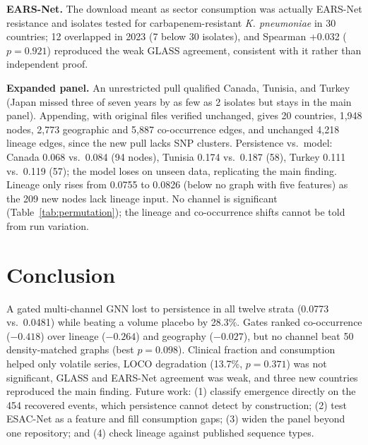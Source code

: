 \documentclass[journal]{IEEEtran}
\begin{document}
\textbf{EARS-Net.} The download meant as sector consumption was actually EARS-Net resistance and isolates tested for carbapenem-resistant \textit{K. pneumoniae} in 30 countries; 12 overlapped in 2023 (7 below 30 isolates), and Spearman +0.032 ($p=0.921$) reproduced the weak GLASS agreement, consistent with it rather than independent proof.

\textbf{Expanded panel.} An unrestricted pull qualified Canada, Tunisia, and Turkey (Japan missed three of seven years by as few as 2 isolates but stays in the main panel). Appending, with original files verified unchanged, gives 20 countries, 1,948 nodes, 2,773 geographic and 5,887 co-occurrence edges, and unchanged 4,218 lineage edges, since the new pull lacks SNP clusters. Persistence vs.\ model: Canada 0.068 vs.\ 0.084 (94 nodes), Tunisia 0.174 vs.\ 0.187 (58), Turkey 0.111 vs.\ 0.119 (57); the model loses on unseen data, replicating the main finding. Lineage only rises from 0.0755 to 0.0826 (below no graph with five features) as the 209 new nodes lack lineage input. No channel is significant (Table~\ref{tab:permutation}); the lineage and co-occurrence shifts cannot be told from run variation.

\section{Conclusion}\label{sec:concl}
A gated multi-channel GNN lost to persistence in all twelve strata (0.0773 vs.\ 0.0481) while beating a volume placebo by 28.3\%. Gates ranked co-occurrence ($-0.418$) over lineage ($-0.264$) and geography ($-0.027$), but no channel beat 50 density-matched graphs (best $p=0.098$). Clinical fraction and consumption helped only volatile series, LOCO degradation (13.7\%, $p=0.371$) was not significant, GLASS and EARS-Net agreement was weak, and three new countries reproduced the main finding. Future work: (1) classify emergence directly on the 454 recovered events, which persistence cannot detect by construction; (2) test ESAC-Net as a feature and fill consumption gaps; (3) widen the panel beyond one repository; and (4) check lineage against published sequence types.
\end{document}
